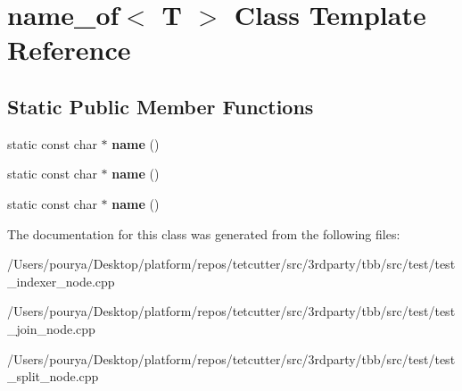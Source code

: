 \hypertarget{classname__of}{}\section{name\+\_\+of$<$ T $>$ Class Template Reference}
\label{classname__of}
\subsection*{Static Public Member Functions}
\begin{DoxyCompactItemize}
\item 
\hypertarget{classname__of_ae214f5f043ee5dce0bb9dfe7ff1347b9}{}static const char $\ast$ {\bfseries name} ()\label{classname__of_ae214f5f043ee5dce0bb9dfe7ff1347b9}

\item 
\hypertarget{classname__of_ae214f5f043ee5dce0bb9dfe7ff1347b9}{}static const char $\ast$ {\bfseries name} ()\label{classname__of_ae214f5f043ee5dce0bb9dfe7ff1347b9}

\item 
\hypertarget{classname__of_ae214f5f043ee5dce0bb9dfe7ff1347b9}{}static const char $\ast$ {\bfseries name} ()\label{classname__of_ae214f5f043ee5dce0bb9dfe7ff1347b9}

\end{DoxyCompactItemize}


The documentation for this class was generated from the following files\+:\begin{DoxyCompactItemize}
\item 
/\+Users/pourya/\+Desktop/platform/repos/tetcutter/src/3rdparty/tbb/src/test/test\+\_\+indexer\+\_\+node.\+cpp\item 
/\+Users/pourya/\+Desktop/platform/repos/tetcutter/src/3rdparty/tbb/src/test/test\+\_\+join\+\_\+node.\+cpp\item 
/\+Users/pourya/\+Desktop/platform/repos/tetcutter/src/3rdparty/tbb/src/test/test\+\_\+split\+\_\+node.\+cpp\end{DoxyCompactItemize}
